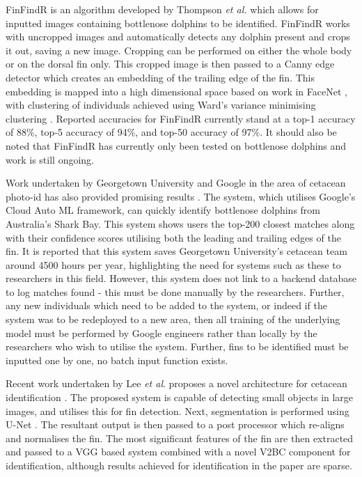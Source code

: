 FinFindR is an algorithm developed by Thompson \textit{et al.} \cite{thompson_finfindr_2022} which allows for inputted images containing bottlenose dolphins to be identified. FinFindR works with uncropped images and automatically detects any dolphin present and crops it out, saving a new image. Cropping can be performed on either the whole body or on the dorsal fin only. This cropped image is then passed to a Canny edge detector which creates an embedding of the trailing edge of the fin. This embedding is mapped into a high dimensional space based on work in FaceNet \cite{schroff_facenet_2015}, with clustering of individuals achieved using Ward's variance minimising clustering \cite{ward_hierarchical_1963}. Reported accuracies for FinFindR currently stand at a top-1 accuracy of 88\%, top-5 accuracy of 94\%, and top-50 accuracy of 97\%. It should also be noted that FinFindR has currently only been tested on bottlenose dolphins and work is still ongoing.

Work undertaken by Georgetown University and Google in the area of cetacean photo-id has also provided promising results \cite{georgetown_university_is_2018}. The system, which utilises Google's Cloud Auto ML framework, can quickly identify bottlenose dolphins from Australia's Shark Bay. This system shows users the top-200 closest matches along with their confidence scores utilising both the leading and trailing edges of the fin. It is reported that this system saves Georgetown University's cetacean team around 4500 hours per year, highlighting the need for systems such as these to researchers in this field. However, this system does not link to a backend database to log matches found - this must be done manually by the researchers. Further, any new individuals which need to be added to the system, or indeed if the system was to be redeployed to a new area, then all training of the underlying model must be performed by Google engineers rather than locally by the researchers who wish to utilise the system. Further, fins to be identified must be inputted one by one, no batch input function exists.  

Recent work undertaken by Lee \textit{et al}. proposes a novel architecture for cetacean identification \cite{lee_backbone_2020}. The proposed system is capable of detecting small objects in large images, and utilises this for fin detection. Next, segmentation is performed using U-Net \cite{ronneberger_u-net_2015}. The resultant output is then passed to a post processor which re-aligns and normalises the fin. The most significant features of the fin are then extracted and passed to a VGG based system \cite{simonyan_very_2015} combined with a novel V2BC component for identification, although results achieved for identification in the paper are sparse.


